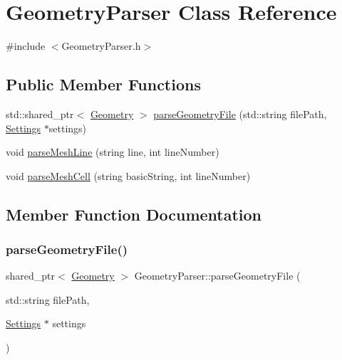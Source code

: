 \hypertarget{classGeometryParser}{}\section{Geometry\+Parser Class Reference}
\label{classGeometryParser}


{\ttfamily \#include $<$Geometry\+Parser.\+h$>$}

\subsection*{Public Member Functions}
\begin{DoxyCompactItemize}
\item 
std\+::shared\+\_\+ptr$<$ \mbox{\hyperlink{classGeometry}{Geometry}} $>$ \mbox{\hyperlink{classGeometryParser_a5a77e5ba1386bcf195de4b241f169464}{parse\+Geometry\+File}} (std\+::string file\+Path, \mbox{\hyperlink{structSettings}{Settings}} $\ast$settings)
\item 
void \mbox{\hyperlink{classGeometryParser_a2245b52d12835aafad6b3bd67914215b}{parse\+Mesh\+Line}} (string line, int line\+Number)
\item 
void \mbox{\hyperlink{classGeometryParser_a599d22091fded7248c6d0bfd8a70caf0}{parse\+Mesh\+Cell}} (string basic\+String, int line\+Number)
\end{DoxyCompactItemize}


\subsection{Member Function Documentation}
\mbox{\label{classGeometryParser_a5a77e5ba1386bcf195de4b241f169464}} 
\subsubsection{\texorpdfstring{parseGeometryFile()}{parseGeometryFile()}}
{\footnotesize\ttfamily shared\+\_\+ptr$<$ \mbox{\hyperlink{classGeometry}{Geometry}} $>$ Geometry\+Parser\+::parse\+Geometry\+File (\begin{DoxyParamCaption}\item[{std\+::string}]{file\+Path,  }\item[{\mbox{\hyperlink{structSettings}{Settings}} $\ast$}]{settings }\end{DoxyParamCaption})}


